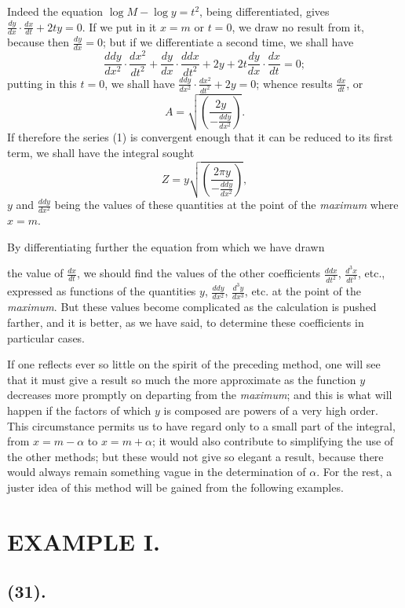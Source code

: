 \documentclass{article}
\begin{document}
Indeed the equation $\log M-\log y=t^{2}$, being differentiated, gives $\frac{dy}{dx}\cdot\frac{dx}{dt}+2ty=0$. If we put in it $x=m$ or $t=0$, we draw no result from it, because then $\frac{dy}{dx}=0$; but if we differentiate a second time, we shall have
\[ \frac{ddy}{dx^{2}}\cdot\frac{dx^{2}}{dt^{2}}+\frac{dy}{dx}\cdot\frac{ddx}{dt^{2}}+2y+2t\frac{dy}{dx}\cdot\frac{dx}{dt}=0; \]
putting in this $t=0$, we shall have $\frac{ddy}{dx^{2}}\cdot\frac{dx^{2}}{dt^{2}}+2y=0$; whence results $\frac{dx}{dt}$, or
\[ A=\sqrt{\left(\frac{2y}{-\frac{ddy}{dx^{2}}}\right)}. \]
If therefore the series (1) is convergent enough that it can be reduced to its first term, we shall have the integral sought
\[ Z=y\sqrt{\left(\frac{2\pi y}{-\frac{ddy}{dx^{2}}}\right)}, \]
$y$ and $\frac{ddy}{dx^{2}}$ being the values of these quantities at the point of the \emph{maximum} where $x=m$.

By differentiating further the equation from which we have drawn

the value of $\frac{dx}{dt}$, we should find the values of the other coefficients $\frac{ddx}{dt^{2}}$, $\frac{d^{3}x}{dt^{3}}$, etc., expressed as functions of the quantities $y$, $\frac{ddy}{dx^{2}}$, $\frac{d^{3}y}{dx^{3}}$, etc. at the point of the \emph{maximum}. But these values become complicated as the calculation is pushed farther, and it is better, as we have said, to determine these coefficients in particular cases.

If one reflects ever so little on the spirit of the preceding method, one will see that it must give a result so much the more approximate as the function $y$ decreases more promptly on departing from the \emph{maximum}; and this is what will happen if the factors of which $y$ is composed are powers of a very high order. This circumstance permits us to have regard only to a small part of the integral, from $x=m-\alpha$ to $x=m+\alpha$; it would also contribute to simplifying the use of the other methods; but these would not give so elegant a result, because there would always remain something vague in the determination of $\alpha$. For the rest, a juster idea of this method will be gained from the following examples.

\section*{EXAMPLE I.}

\subsection*{(31).}
\end{document}
